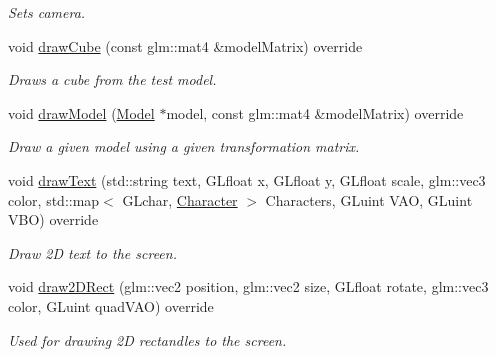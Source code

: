 \begin{DoxyCompactItemize}
\begin{DoxyCompactList}\small\item\em Sets camera. \end{DoxyCompactList}\item 
\hypertarget{class_g_l_f_w___engine_core_a728d1f6ffd1e8526611ab0856db537c0}{void \hyperlink{class_g_l_f_w___engine_core_a728d1f6ffd1e8526611ab0856db537c0}{draw\+Cube} (const glm\+::mat4 \&model\+Matrix) override}\label{class_g_l_f_w___engine_core_a728d1f6ffd1e8526611ab0856db537c0}

\begin{DoxyCompactList}\small\item\em Draws a cube from the test model. \end{DoxyCompactList}\item 
\hypertarget{class_g_l_f_w___engine_core_abee5bb01d70b20b2b3b79e29940a7027}{void \hyperlink{class_g_l_f_w___engine_core_abee5bb01d70b20b2b3b79e29940a7027}{draw\+Model} (\hyperlink{class_model}{Model} $\ast$model, const glm\+::mat4 \&model\+Matrix) override}\label{class_g_l_f_w___engine_core_abee5bb01d70b20b2b3b79e29940a7027}

\begin{DoxyCompactList}\small\item\em Draw a given model using a given transformation matrix. \end{DoxyCompactList}\item 
\hypertarget{class_g_l_f_w___engine_core_a6fe7117af3b6fb2417e0220bc2d0699a}{void \hyperlink{class_g_l_f_w___engine_core_a6fe7117af3b6fb2417e0220bc2d0699a}{draw\+Text} (std\+::string text, G\+Lfloat x, G\+Lfloat y, G\+Lfloat scale, glm\+::vec3 color, std\+::map$<$ G\+Lchar, \hyperlink{struct_character}{Character} $>$ Characters, G\+Luint V\+A\+O, G\+Luint V\+B\+O) override}\label{class_g_l_f_w___engine_core_a6fe7117af3b6fb2417e0220bc2d0699a}

\begin{DoxyCompactList}\small\item\em Draw 2\+D text to the screen. \end{DoxyCompactList}\item 
\hypertarget{class_g_l_f_w___engine_core_a846b93bbea69b54fdbf162c525911620}{void \hyperlink{class_g_l_f_w___engine_core_a846b93bbea69b54fdbf162c525911620}{draw2\+D\+Rect} (glm\+::vec2 position, glm\+::vec2 size, G\+Lfloat rotate, glm\+::vec3 color, G\+Luint quad\+V\+A\+O) override}\label{class_g_l_f_w___engine_core_a846b93bbea69b54fdbf162c525911620}

\begin{DoxyCompactList}\small\item\em Used for drawing 2\+D rectandles to the screen. \end{DoxyCompactList}\end{DoxyCompactItemize}
